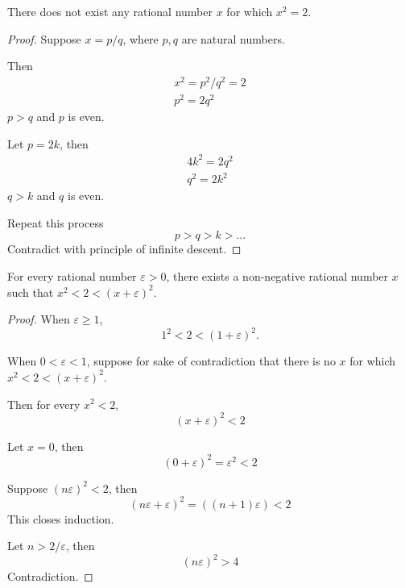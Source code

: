 \documentclass{blog}
\begin{document}
\begin{proposition}[$\sqrt{2}$]
  There does not exist any rational number $x$ for which $x^{2} = 2$.
\end{proposition}

\begin{proof}
  Suppose $x = p / q$, where $p, q$ are natural numbers.

  Then
  \begin{gather*}
    x^{2} = p^{2} / q^{2} = 2 \\
    p^{2} = 2 q^{2}
  \end{gather*}
  $p > q$ and $p$ is even.

  Let $p = 2 k$, then
  \begin{gather*}
    4 k^{2} = 2 q^{2} \\
    q^{2} = 2 k^{2}
  \end{gather*}
  $q > k$ and $q$ is even.

  Repeat this process
  \begin{equation*}
    p > q > k > ...
  \end{equation*}
  Contradict with principle of infinite descent.
\end{proof}

\begin{proposition}
  For every rational number $\varepsilon > 0$,
  there exists a non-negative rational number $x$ such that $x^{2} < 2 < (x + \varepsilon)^{2}$.
\end{proposition}

\begin{proof}
  When $\varepsilon \geq 1$,
  \begin{equation*}
    1^{2} < 2 < (1 + \varepsilon)^2.
  \end{equation*}

  When $0 < \varepsilon < 1$, suppose for sake of contradiction that there is no $x$ for which
  $x^{2} < 2 < (x + \varepsilon)^{2}$.

  Then for every $x^{2} < 2$,
  \begin{equation*}
    (x + \varepsilon)^{2} < 2
  \end{equation*}

  Let $x = 0$, then
  \begin{equation*}
    (0 + \varepsilon)^{2} = \varepsilon^{2} < 2
  \end{equation*}

  Suppose $(n \varepsilon)^{2} < 2$, then
  \begin{equation*}
    (n \varepsilon + \varepsilon)^{2} = ((n + 1) \varepsilon) < 2
  \end{equation*}
  This closes induction.

  Let $n > 2 / \varepsilon$, then
  \begin{equation*}
    (n \varepsilon)^{2} > 4
  \end{equation*}
  Contradiction.
\end{proof}
\end{document}
